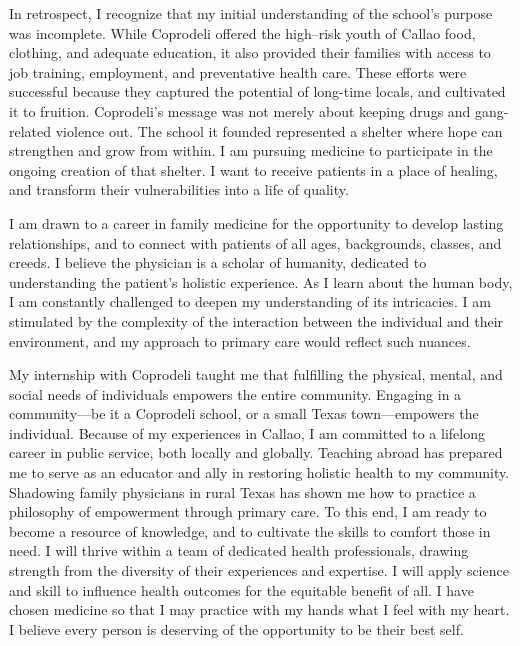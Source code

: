\documentclass[12pt,a4paper,roman]{moderncv} %
\begin{document}
\medskip

In retrospect, I recognize that my initial understanding of the school's purpose was incomplete. While Coprodeli offered the high--risk youth of Callao food, clothing, and adequate education, it also provided their families with access to job training, employment, and preventative health care. These efforts were successful because they captured the potential of long-time locals, and cultivated it to fruition. Coprodeli's message was not merely about keeping drugs and gang-related violence out. The school it founded represented a shelter where hope can strengthen and grow from within. I am pursuing medicine to participate in the ongoing creation of that shelter. I want to receive patients in a place of healing, and transform their vulnerabilities into a life of quality.

\medskip

I am drawn to a career in family medicine for the opportunity to develop lasting relationships, and to connect with patients of all ages, backgrounds, classes, and creeds. I believe the physician is a scholar of humanity, dedicated to understanding the patient's holistic experience. As I learn about the human body, I am constantly challenged to deepen my understanding of its intricacies. I am stimulated by the complexity of the interaction between the individual and their environment, and my approach to primary care would reflect such nuances. 

\medskip

My internship with Coprodeli taught me that fulfilling the physical, mental, and social needs of individuals empowers the entire community. Engaging in a community---be it a Coprodeli school, or a small Texas town---empowers the individual. Because of my experiences in Callao, I am committed to a lifelong career in public service, both locally and globally. Teaching abroad has prepared me to serve as an educator and ally in restoring holistic health to my community. Shadowing family physicians in rural Texas has shown me how to practice a philosophy of empowerment through primary care. To this end, I am ready to become a resource of knowledge, and to cultivate the skills to comfort those in need.  I will thrive within a team of dedicated health professionals, drawing strength from the diversity of their experiences and expertise. I will apply science and skill to influence health outcomes for the equitable benefit of all. I have chosen medicine so that I may practice with my hands what I feel with my heart. I believe every person is deserving of the opportunity to be their best self.
\end{document}
